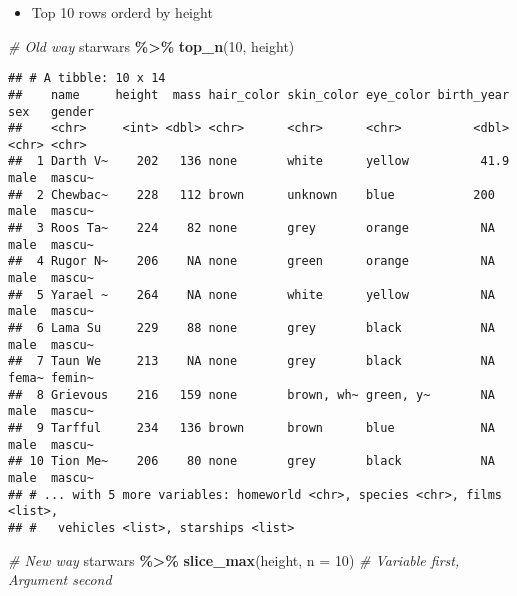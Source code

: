 \documentclass[
]{book}
\newenvironment{Shaded}{\begin{snugshade}}{\end{snugshade}}
\newcommand{\CommentTok}[1]{\textcolor[rgb]{0.56,0.35,0.01}{\textit{#1}}}
\newcommand{\DataTypeTok}[1]{\textcolor[rgb]{0.13,0.29,0.53}{#1}}
\newcommand{\DecValTok}[1]{\textcolor[rgb]{0.00,0.00,0.81}{#1}}
\newcommand{\KeywordTok}[1]{\textcolor[rgb]{0.13,0.29,0.53}{\textbf{#1}}}
\newcommand{\NormalTok}[1]{#1}
\newcommand{\OperatorTok}[1]{\textcolor[rgb]{0.81,0.36,0.00}{\textbf{#1}}}
\newcommand{\StringTok}[1]{\textcolor[rgb]{0.31,0.60,0.02}{#1}}
\providecommand{\tightlist}{%
  \setlength{\itemsep}{0pt}\setlength{\parskip}{0pt}}
\begin{document}
\begin{itemize}
\tightlist
\item
  Top 10 rows orderd by height
\end{itemize}

\begin{Shaded}
\begin{Highlighting}[]
\CommentTok{\# Old way}
\NormalTok{starwars }\OperatorTok{\%\textgreater{}\%}
\StringTok{  }\KeywordTok{top\_n}\NormalTok{(}\DecValTok{10}\NormalTok{, height)}
\end{Highlighting}
\end{Shaded}

\begin{verbatim}
## # A tibble: 10 x 14
##    name     height  mass hair_color skin_color eye_color birth_year sex   gender
##    <chr>     <int> <dbl> <chr>      <chr>      <chr>          <dbl> <chr> <chr> 
##  1 Darth V~    202   136 none       white      yellow          41.9 male  mascu~
##  2 Chewbac~    228   112 brown      unknown    blue           200   male  mascu~
##  3 Roos Ta~    224    82 none       grey       orange          NA   male  mascu~
##  4 Rugor N~    206    NA none       green      orange          NA   male  mascu~
##  5 Yarael ~    264    NA none       white      yellow          NA   male  mascu~
##  6 Lama Su     229    88 none       grey       black           NA   male  mascu~
##  7 Taun We     213    NA none       grey       black           NA   fema~ femin~
##  8 Grievous    216   159 none       brown, wh~ green, y~       NA   male  mascu~
##  9 Tarfful     234   136 brown      brown      blue            NA   male  mascu~
## 10 Tion Me~    206    80 none       grey       black           NA   male  mascu~
## # ... with 5 more variables: homeworld <chr>, species <chr>, films <list>,
## #   vehicles <list>, starships <list>
\end{verbatim}

\begin{Shaded}
\begin{Highlighting}[]
\CommentTok{\# New way}
\NormalTok{starwars }\OperatorTok{\%\textgreater{}\%}
\StringTok{  }\KeywordTok{slice\_max}\NormalTok{(height, }\DataTypeTok{n =} \DecValTok{10}\NormalTok{) }\CommentTok{\# Variable first, Argument second}
\end{Highlighting}
\end{Shaded}
\end{document}

